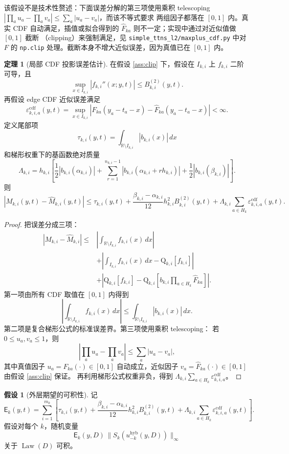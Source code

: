 \documentclass[a4paper,11pt]{article}
\theoremstyle{definition}
\newtheorem{theorem}{定理}
\newtheorem{assumption}{假设}
\newcommand{\R}{\mathbb R}
\newcommand{\1}{\mathbf 1}
\newcommand{\Law}{\operatorname{Law}}
\newcommand{\Qtrap}{\mathrm Q}
\newcommand{\Eerr}{\mathsf E}
\newcommand{\ecdf}{\varepsilon^{\mathrm{cdf}}}
\begin{document}
该假设不是技术性赘述：下面误差分解的第三项使用乘积 telescoping
$\left|\prod_a u_a-\prod_a v_a\right|\le\sum_a|u_a-v_a|$，而该不等式要求
两组因子都落在 $[0,1]$ 内。真实 CDF 自动满足，插值或拟合得到的
$\widehat F_{ka}$ 则不一定；实现中通过对近似值做 $[0,1]$ 截断
（clipping）来强制满足，见
\texttt{simple\_ttns\_l2/}\allowbreak\texttt{maxplus\_cdf.py} 中对 $F$ 的
\texttt{np.clip} 处理。截断本身不增大近似误差，因为真值已在 $[0,1]$ 内。

\begin{theorem}[局部 CDF 投影误差估计]
\label{thm:localerr}
在假设 \ref{ass:clip} 下，假设在 $I_{k,i}$ 上 $f_{k,i}$ 二阶可导，且
\[
\sup_{x\in I_{k,i}}|f_{k,i}''(x;y,t)|\le B_{k,i}^{(2)}(y,t).
\]
再假设 edge CDF 近似误差满足
\[
\ecdf_{k,i,a}(y,t)
=
\sup_{x\in I_{k,i}}
\left|
F_{ka}(y_a-t_a-x)-\widehat F_{ka}(y_a-t_a-x)
\right|
<\infty.
\]
定义尾部项
\[
\tau_{k,i}(y,t)
=
\int_{\R\setminus I_{k,i}}|b_{k,i}(x)|\,dx
\]
和梯形权重下的基函数绝对质量
\[
\Lambda_{k,i}
=
h_{k,i}
\left[
\frac12|b_{k,i}(\alpha_{k,i})|
+
\sum_{r=1}^{n_{k,i}-1}
|b_{k,i}(\alpha_{k,i}+r h_{k,i})|
+
\frac12|b_{k,i}(\beta_{k,i})|
\right].
\]
则
\[
\left|
M_{k,i}(y,t)-\widehat M_{k,i}(y,t)
\right|
\le
\tau_{k,i}(y,t)
+
\frac{\beta_{k,i}-\alpha_{k,i}}{12}
h_{k,i}^2 B_{k,i}^{(2)}(y,t)
+
\Lambda_{k,i}
\sum_{a\in H_k}\ecdf_{k,i,a}(y,t).
\]
\end{theorem}

\begin{proof}
把误差分成三项：
\[
\begin{aligned}
|M_{k,i}-\widehat M_{k,i}|
\le{}&
\left|\int_{\R\setminus I_{k,i}}f_{k,i}(x)\,dx\right|\\
&+
\left|\int_{I_{k,i}}f_{k,i}(x)\,dx-\Qtrap_{k,i}[f_{k,i}]\right|\\
&+
\left|
\Qtrap_{k,i}[f_{k,i}]
-
\Qtrap_{k,i}\left[
b_{k,i}\prod_{a\in H_k}\widehat F_{ka}
\right]
\right|.
\end{aligned}
\]
第一项由所有 CDF 取值在 $[0,1]$ 内得到
\[
\left|\int_{\R\setminus I_{k,i}}f_{k,i}(x)\,dx\right|
\le
\int_{\R\setminus I_{k,i}}|b_{k,i}(x)|\,dx.
\]
第二项是复合梯形公式的标准误差界。第三项使用乘积 telescoping：
若 $0\le u_a,v_a\le 1$，则
\[
\left|\prod_a u_a-\prod_a v_a\right|\le \sum_a |u_a-v_a|,
\]
其中真值因子 $u_a=F_{ka}(\cdot)\in[0,1]$ 自动成立，近似因子
$v_a=\widehat F_{ka}(\cdot)\in[0,1]$ 由假设 \ref{ass:clip} 保证。
再利用梯形公式权重非负，得到
$\Lambda_{k,i}\sum_{a\in H_k}\ecdf_{k,i,a}$。
\end{proof}

\begin{assumption}[外层期望的可积性]
\label{ass:integrable}
记
\[
\Eerr_k(y,t)
=
\sum_{i=1}^{m_k}
\left[
\tau_{k,i}(y,t)
+
\frac{\beta_{k,i}-\alpha_{k,i}}{12}h_{k,i}^2B_{k,i}^{(2)}(y,t)
+
\Lambda_{k,i}\sum_{a\in H_k}\ecdf_{k,i,a}(y,t)
\right].
\]
假设对每个 $k$，随机变量
\[
\Eerr_k(y,D)\,
\bigl\|S_k(u_{-k}^{\mathrm{hyb}}(y,D))\bigr\|_\infty
\]
关于 $\Law(D)$ 可积。
\end{assumption}
\end{document}

